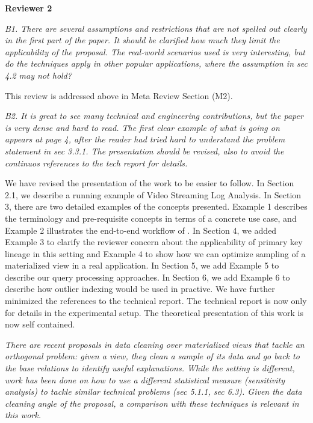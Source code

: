 \vspace{1em}
\noindent\textbf{Reviewer 2}

\emph{B1. There are several assumptions and restrictions that are not spelled out clearly in the first part of the paper. It should be clarified how much they limit the applicability of the proposal. The real-world scenarios used is very interesting, but do the techniques apply in other popular applications, where the assumption in sec 4.2 may not hold?}

This review is addressed above in Meta Review Section (M2).

\vspace{1em}
\emph{B2. It is great to see many technical and engineering contributions, but the paper is very dense and hard to read. The first clear example of what is going on appears at page 4, after the reader had tried hard to understand the problem statement in sec 3.3.1. The presentation should be revised, also to avoid the continuos references to the tech report for details.}

We have revised the presentation of the work to be easier to follow. In Section 2.1, we describe a running example of Video Streaming Log Analysis. In Section 3, there are two detailed examples of the concepts presented. Example 1 describes the terminology and pre-requisite concepts in terms of a concrete use case, and Example 2 illustrates the end-to-end workflow of \svc. In Section 4, we added Example 3 to clarify the reviewer concern about the applicability of primary key lineage in this setting and Example 4 to show how we can optimize sampling of a materialized view in a real application. In Section 5, we add Example 5 to describe our query processing approaches. In Section 6, we add Example 6 to describe how outlier indexing would be used in practive. We have further minimized the references to the technical report. The technical report is now only for details in the experimental setup. The theoretical presentation of this work is now self contained.

\vspace{1em}
\emph{There are recent proposals in data cleaning over materialized views that tackle an orthogonal problem: given a view, they clean a sample of its data and go back to the base relations to identify useful explanations. While the setting is different, work has been done on how to use a different statistical measure (sensitivity analysis) to tackle similar technical problems (sec 5.1.1, sec 6.3). Given the data cleaning angle of the proposal, a comparison with these techniques is relevant in this work.}


